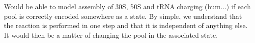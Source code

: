 \textcolor[rgb]{1.00,0.00,0.00}{Would be able to model assembly of 30S, 50S and tRNA charging (hum...) if each pool is correctly encoded somewhere as a state. By simple, we understand that the reaction is performed in one step and that it is independent of anything else. It would then be a matter of changing the pool in the associated state.
}